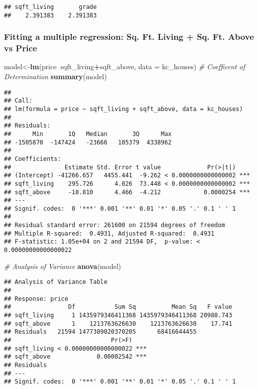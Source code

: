 \documentclass[]{article}
\newenvironment{Shaded}{\begin{snugshade}}{\end{snugshade}}
\newcommand{\CommentTok}[1]{\textcolor[rgb]{0.56,0.35,0.01}{\textit{#1}}}
\newcommand{\DataTypeTok}[1]{\textcolor[rgb]{0.13,0.29,0.53}{#1}}
\newcommand{\KeywordTok}[1]{\textcolor[rgb]{0.13,0.29,0.53}{\textbf{#1}}}
\newcommand{\NormalTok}[1]{#1}
\newcommand{\OperatorTok}[1]{\textcolor[rgb]{0.81,0.36,0.00}{\textbf{#1}}}
\begin{document}
\begin{verbatim}
## sqft_living       grade 
##    2.391383    2.391383
\end{verbatim}

\hypertarget{fitting-a-multiple-regression-sq.-ft.-living-sq.-ft.-above-vs-price}{%
\subsubsection{Fitting a multiple regression: Sq. Ft. Living + Sq. Ft.
Above vs
Price}\label{fitting-a-multiple-regression-sq.-ft.-living-sq.-ft.-above-vs-price}}

\begin{Shaded}
\begin{Highlighting}[]
\NormalTok{model<-}\KeywordTok{lm}\NormalTok{(price}\OperatorTok{~}\NormalTok{sqft_living}\OperatorTok{+}\NormalTok{sqft_above, }\DataTypeTok{data =}\NormalTok{ kc_houses)}
\CommentTok{# Coefficent of Determination}
\KeywordTok{summary}\NormalTok{(model)}
\end{Highlighting}
\end{Shaded}

\begin{verbatim}
## 
## Call:
## lm(formula = price ~ sqft_living + sqft_above, data = kc_houses)
## 
## Residuals:
##      Min       1Q   Median       3Q      Max 
## -1505870  -147424   -23666   105379  4338962 
## 
## Coefficients:
##               Estimate Std. Error t value             Pr(>|t|)    
## (Intercept) -41266.657   4455.441  -9.262 < 0.0000000000000002 ***
## sqft_living    295.726      4.026  73.448 < 0.0000000000000002 ***
## sqft_above     -18.810      4.466  -4.212            0.0000254 ***
## ---
## Signif. codes:  0 '***' 0.001 '**' 0.01 '*' 0.05 '.' 0.1 ' ' 1
## 
## Residual standard error: 261600 on 21594 degrees of freedom
## Multiple R-squared:  0.4931, Adjusted R-squared:  0.4931 
## F-statistic: 1.05e+04 on 2 and 21594 DF,  p-value: < 0.00000000000000022
\end{verbatim}

\begin{Shaded}
\begin{Highlighting}[]
\CommentTok{# Analysis of Variance}
\KeywordTok{anova}\NormalTok{(model)}
\end{Highlighting}
\end{Shaded}

\begin{verbatim}
## Analysis of Variance Table
## 
## Response: price
##                Df           Sum Sq          Mean Sq   F value
## sqft_living     1 1435979346411368 1435979346411368 20988.743
## sqft_above      1    1213763626630    1213763626630    17.741
## Residuals   21594 1477389020370205      68416644455          
##                            Pr(>F)    
## sqft_living < 0.00000000000000022 ***
## sqft_above             0.00002542 ***
## Residuals                            
## ---
## Signif. codes:  0 '***' 0.001 '**' 0.01 '*' 0.05 '.' 0.1 ' ' 1
\end{verbatim}
\end{document}
